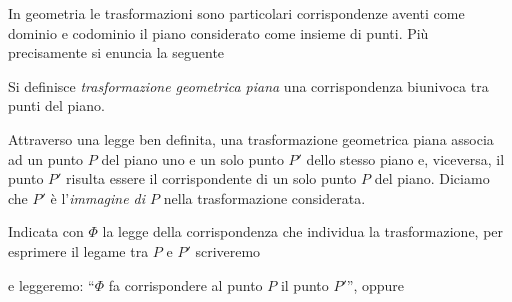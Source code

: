 
In geometria le trasformazioni sono particolari corrispondenze aventi come dominio e codominio il piano considerato come insieme di punti. Più precisamente si enuncia la seguente

\begin{definizione}
Si definisce \emph{trasformazione geometrica piana} una corrispondenza biunivoca tra punti del piano.
\end{definizione}

Attraverso una legge ben definita, una trasformazione geometrica piana associa ad un punto $P$ del piano uno e un solo punto $P'$ dello stesso piano e, viceversa, il punto $P'$ risulta essere il corrispondente di un solo punto $P$ del piano. Diciamo che $P'$ è l'\emph{immagine di $P$} nella trasformazione considerata.


Indicata con $\Phi$ la legge della corrispondenza che individua la trasformazione, per esprimere il legame tra $P$ e $P'$ scriveremo


\noindent e leggeremo: ``$\Phi$ fa corrispondere al punto $P$ il punto $P'$'', oppure

